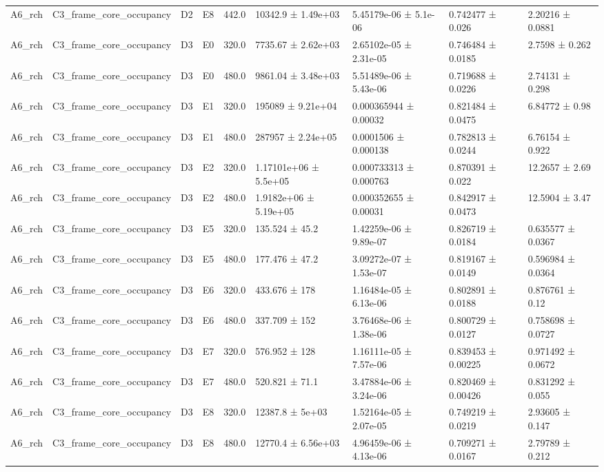 \begin{table}
\begin{tabular}{lllllllll}
A6\_rch & C3\_frame\_core\_occupancy & D2 & E8 & 442.0 & 10342.9 ± 1.49e+03 & 5.45179e-06 ± 5.1e-06 & 0.742477 ± 0.026 & 2.20216 ± 0.0881 \\
A6\_rch & C3\_frame\_core\_occupancy & D3 & E0 & 320.0 & 7735.67 ± 2.62e+03 & 2.65102e-05 ± 2.31e-05 & 0.746484 ± 0.0185 & 2.7598 ± 0.262 \\
A6\_rch & C3\_frame\_core\_occupancy & D3 & E0 & 480.0 & 9861.04 ± 3.48e+03 & 5.51489e-06 ± 5.43e-06 & 0.719688 ± 0.0226 & 2.74131 ± 0.298 \\
A6\_rch & C3\_frame\_core\_occupancy & D3 & E1 & 320.0 & 195089 ± 9.21e+04 & 0.000365944 ± 0.00032 & 0.821484 ± 0.0475 & 6.84772 ± 0.98 \\
A6\_rch & C3\_frame\_core\_occupancy & D3 & E1 & 480.0 & 287957 ± 2.24e+05 & 0.0001506 ± 0.000138 & 0.782813 ± 0.0244 & 6.76154 ± 0.922 \\
A6\_rch & C3\_frame\_core\_occupancy & D3 & E2 & 320.0 & 1.17101e+06 ± 5.5e+05 & 0.000733313 ± 0.000763 & 0.870391 ± 0.022 & 12.2657 ± 2.69 \\
A6\_rch & C3\_frame\_core\_occupancy & D3 & E2 & 480.0 & 1.9182e+06 ± 5.19e+05 & 0.000352655 ± 0.00031 & 0.842917 ± 0.0473 & 12.5904 ± 3.47 \\
A6\_rch & C3\_frame\_core\_occupancy & D3 & E5 & 320.0 & 135.524 ± 45.2 & 1.42259e-06 ± 9.89e-07 & 0.826719 ± 0.0184 & 0.635577 ± 0.0367 \\
A6\_rch & C3\_frame\_core\_occupancy & D3 & E5 & 480.0 & 177.476 ± 47.2 & 3.09272e-07 ± 1.53e-07 & 0.819167 ± 0.0149 & 0.596984 ± 0.0364 \\
A6\_rch & C3\_frame\_core\_occupancy & D3 & E6 & 320.0 & 433.676 ± 178 & 1.16484e-05 ± 6.13e-06 & 0.802891 ± 0.0188 & 0.876761 ± 0.12 \\
A6\_rch & C3\_frame\_core\_occupancy & D3 & E6 & 480.0 & 337.709 ± 152 & 3.76468e-06 ± 1.38e-06 & 0.800729 ± 0.0127 & 0.758698 ± 0.0727 \\
A6\_rch & C3\_frame\_core\_occupancy & D3 & E7 & 320.0 & 576.952 ± 128 & 1.16111e-05 ± 7.57e-06 & 0.839453 ± 0.00225 & 0.971492 ± 0.0672 \\
A6\_rch & C3\_frame\_core\_occupancy & D3 & E7 & 480.0 & 520.821 ± 71.1 & 3.47884e-06 ± 3.24e-06 & 0.820469 ± 0.00426 & 0.831292 ± 0.055 \\
A6\_rch & C3\_frame\_core\_occupancy & D3 & E8 & 320.0 & 12387.8 ± 5e+03 & 1.52164e-05 ± 2.07e-05 & 0.749219 ± 0.0219 & 2.93605 ± 0.147 \\
A6\_rch & C3\_frame\_core\_occupancy & D3 & E8 & 480.0 & 12770.4 ± 6.56e+03 & 4.96459e-06 ± 4.13e-06 & 0.709271 ± 0.0167 & 2.79789 ± 0.212 \\

\end{tabular}
\end{table}
